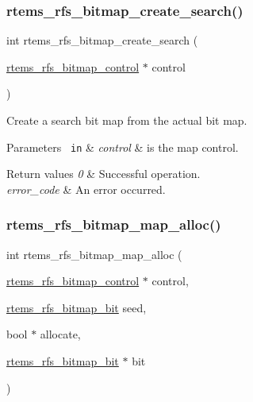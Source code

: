 \subsubsection{\texorpdfstring{rtems\_rfs\_bitmap\_create\_search()}{rtems\_rfs\_bitmap\_create\_search()}}
{\footnotesize\ttfamily int rtems\+\_\+rfs\+\_\+bitmap\+\_\+create\+\_\+search (\begin{DoxyParamCaption}\item[{\mbox{\hyperlink{rtems-rfs-bitmaps_8h_aa1b1de5abc294444428eb1038d7f898b}{rtems\+\_\+rfs\+\_\+bitmap\+\_\+control}} $\ast$}]{control }\end{DoxyParamCaption})}

Create a search bit map from the actual bit map.


\begin{DoxyParams}[1]{Parameters}
\mbox{\texttt{ in}}  & {\em control} & is the map control.\\
\hline
\end{DoxyParams}

\begin{DoxyRetVals}{Return values}
{\em 0} & Successful operation. \\
\hline
{\em error\+\_\+code} & An error occurred. \\
\hline
\end{DoxyRetVals}
\mbox{\label{rtems-rfs-bitmaps_8h_a9440e240c08c3da4132de47af5b9a21b}} 
\subsubsection{\texorpdfstring{rtems\_rfs\_bitmap\_map\_alloc()}{rtems\_rfs\_bitmap\_map\_alloc()}}
{\footnotesize\ttfamily int rtems\+\_\+rfs\+\_\+bitmap\+\_\+map\+\_\+alloc (\begin{DoxyParamCaption}\item[{\mbox{\hyperlink{rtems-rfs-bitmaps_8h_aa1b1de5abc294444428eb1038d7f898b}{rtems\+\_\+rfs\+\_\+bitmap\+\_\+control}} $\ast$}]{control,  }\item[{\mbox{\hyperlink{rtems-rfs-bitmaps_8h_acc1b0aefe1b090890ccbc1b05279a78e}{rtems\+\_\+rfs\+\_\+bitmap\+\_\+bit}}}]{seed,  }\item[{bool $\ast$}]{allocate,  }\item[{\mbox{\hyperlink{rtems-rfs-bitmaps_8h_acc1b0aefe1b090890ccbc1b05279a78e}{rtems\+\_\+rfs\+\_\+bitmap\+\_\+bit}} $\ast$}]{bit }\end{DoxyParamCaption})}

